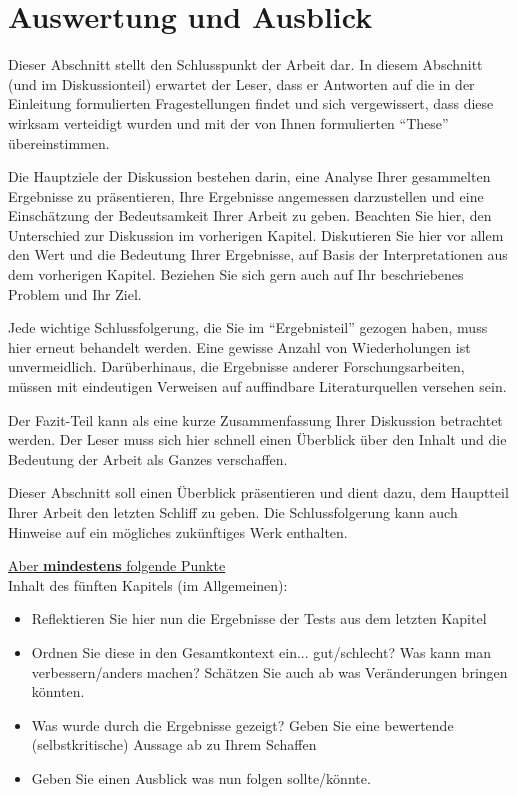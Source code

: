 

\clearpage
\chapter{Auswertung und Ausblick}

Dieser Abschnitt stellt den Schlusspunkt der Arbeit dar. In diesem Abschnitt (und im Diskussionteil) erwartet der Leser, 
dass er Antworten auf die in der Einleitung formulierten Fragestellungen findet und sich vergewissert, 
dass diese wirksam verteidigt wurden und mit der von Ihnen formulierten \enquote{These} übereinstimmen.

Die Hauptziele der Diskussion bestehen darin, eine Analyse Ihrer gesammelten Ergebnisse zu präsentieren, 
Ihre Ergebnisse angemessen darzustellen und eine Einschätzung der Bedeutsamkeit Ihrer Arbeit zu geben. Beachten Sie hier,
den Unterschied zur Diskussion im vorherigen Kapitel. Diskutieren Sie hier vor allem den Wert und die Bedeutung Ihrer Ergebnisse, auf Basis der 
Interpretationen aus dem vorherigen Kapitel. Beziehen Sie sich gern auch auf Ihr beschriebenes Problem und Ihr Ziel.

Jede wichtige Schlussfolgerung, die Sie im \enquote{Ergebnisteil} gezogen haben, 
muss hier erneut behandelt werden. Eine gewisse Anzahl von Wiederholungen ist unvermeidlich. Darüberhinaus, 
die Ergebnisse anderer Forschungsarbeiten, müssen mit eindeutigen Verweisen auf auffindbare Literaturquellen versehen sein.

Der Fazit-Teil kann als eine kurze Zusammenfassung Ihrer Diskussion betrachtet werden. 
Der Leser muss sich hier schnell einen Überblick über den Inhalt und die Bedeutung der Arbeit als Ganzes verschaffen.

Dieser Abschnitt soll einen Überblick präsentieren und dient dazu, dem Hauptteil Ihrer Arbeit den letzten Schliff zu geben. 
Die Schlussfolgerung kann auch Hinweise auf ein mögliches zukünftiges Werk enthalten.

\underline{Aber \textbf{mindestens} folgende Punkte}\\
Inhalt des fünften Kapitels (im Allgemeinen):
\begin{itemize}
    \item Reflektieren Sie hier nun die Ergebnisse der Tests aus dem letzten Kapitel
    \item Ordnen Sie diese in den Gesamtkontext ein... gut/schlecht? Was kann man verbessern/anders machen? Schätzen Sie auch ab was Veränderungen bringen könnten.
    \item Was wurde durch die Ergebnisse gezeigt? Geben Sie eine bewertende (selbstkritische) Aussage ab zu Ihrem Schaffen
    \item Geben Sie einen Ausblick was nun folgen sollte/könnte.
\end{itemize}

